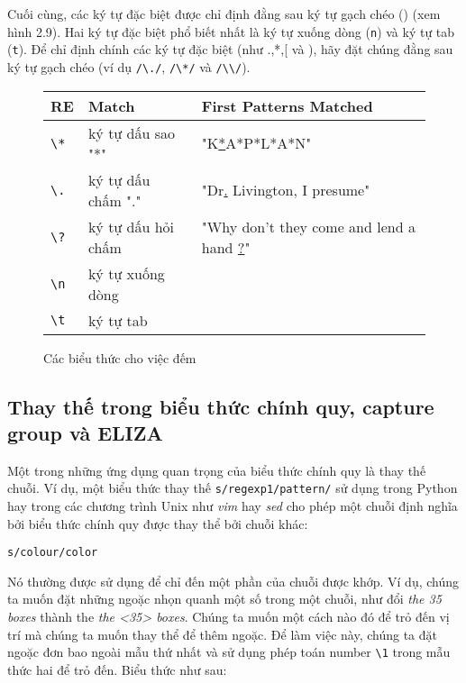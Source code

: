 Cuối cùng, các ký tự đặc biệt được chỉ định đằng sau ký tự gạch chéo () (xem hình 2.9). Hai ký tự đặc biệt phổ biết nhất là ký tự xuống dòng (\texttt{n}) và ký tự tab (\texttt{t}). Để chỉ định chính các ký tự đặc biệt (như .,*,[ và ), hãy đặt chúng đằng sau ký tự gạch chéo (ví dụ \verb|/\./|, \verb|/\*/| và \verb|/\\/|).

\begin{figure}[h]
	\begin{tabular}{ l l l }
	 \hline
	 RE & Match & First Patterns Matched \\
	 \hline
	 \verb|\*| & ký tự dấu sao "*"  & "K\underline{*}A*P*L*A*N"  \\
	 \verb|\.| & ký tự dấu chấm "."  & "Dr\underline{.} Livington, I presume"  \\
	 \verb|\?| & ký tự dấu hỏi chấm & "Why don't they come and lend a hand \underline{?}"  \\
	 \verb|\n| & ký tự xuống dòng  &  \\
	 \verb|\t| & ký tự tab & \\
	 \hline
	\end{tabular}
 \caption{Các biểu thức cho việc đếm}
 \label{table:1}
\end{figure}

\vspace{2em}
\subsection{Thay thế trong biểu thức chính quy, capture group và ELIZA}

Một trong những ứng dụng quan trọng của biểu thức chính quy là thay thế chuỗi. Ví dụ, một biểu thức thay thế \verb|s/regexp1/pattern/| sử dụng trong Python hay trong các chương trình Unix như \textit{vim} hay \textit{sed} cho phép một chuỗi định nghĩa bởi biểu thức chính quy được thay thể bởi chuỗi khác:

\vspace{0.6em}

\noindent \texttt{s/colour/color}

\vspace{0.6em}

Nó thường được sử dụng để chỉ đến một phần của chuỗi được khớp. Ví dụ, chúng ta muốn đặt những ngoặc nhọn quanh một số trong một chuỗi, như đổi \textit{the 35 boxes} thành the \textit{the <35> boxes}. Chúng ta muốn một cách nào đó để trỏ đến vị trí mà chúng ta muốn thay thể để thêm ngoặc. Để làm việc này, chúng ta đặt ngoặc đơn bao ngoài mẫu thứ nhất và sử dụng phép toán number \verb|\1| trong mẫu thức hai để trỏ đến. Biểu thức như sau:


